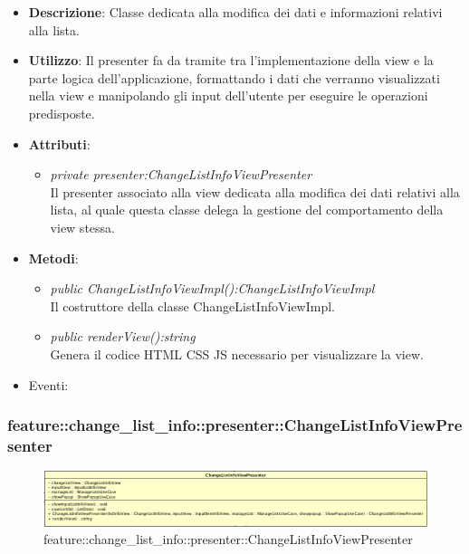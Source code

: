 \begin{itemize}
\item \textbf{Descrizione}: Classe dedicata alla modifica dei dati e informazioni relativi alla lista.
\item \textbf{Utilizzo}: Il presenter fa da tramite tra l'implementazione della view e la parte logica dell'applicazione, formattando i dati che verranno visualizzati nella view e manipolando gli input dell'utente per eseguire le operazioni predisposte.
\item \textbf{Attributi}: 
	\begin{itemize}
	\item \textit{private presenter:ChangeListInfoViewPresenter}\\
	Il presenter associato alla view dedicata alla modifica dei dati relativi alla lista, al quale questa classe delega la gestione del comportamento della view stessa.
	\end{itemize}
\item \textbf{Metodi}:
	\begin{itemize}
	\item \textit{public ChangeListInfoViewImpl():ChangeListInfoViewImpl}\\
	Il costruttore della classe ChangeListInfoViewImpl.	
	\item \textit{public renderView():string}\\
	Genera il codice HTML CSS JS necessario per visualizzare la view.
	\end{itemize}
\item{Eventi}:
\end{itemize}

\subsubsection{feature::change\_list\_info::presenter::ChangeListInfoViewPresenter}

\label{feature::change_list_info::presenter::ChangeListInfoViewPresenter}
\begin{figure}[H]
	\centering
	\includegraphics[scale=0.5]{Sezioni/SottosezioniST/img/app/ChangeListInfoViewPresenter.png}
	\caption{feature::change\_list\_info::presenter::ChangeListInfoViewPresenter}
\end{figure}

